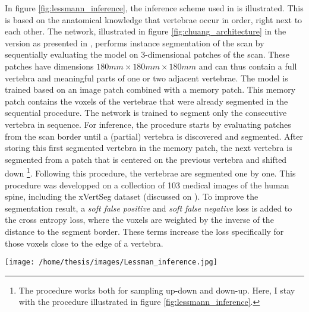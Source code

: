 \par{
    In figure \ref{fig:lessmann_inference}, the inference scheme used in \cite{Lessmann2018} is illustrated.
    This is based on the anatomical knowledge that vertebrae occur in order, right next to each other.
    The network, illustrated in figure \ref{fig:chuang_architecture} in the version as presented in \cite{Chuang2019}, 
    performs instance segmentation of the scan by sequentially evaluating the model on 3-dimensional patches of the scan. 
    These patches have dimensions $180mm \times 180mm \times 180mm$ and can thus contain a full vertebra and meaningful parts of one or two adjacent vertebrae.
    The model is trained based on an image patch combined with a memory patch. This memory patch contains the voxels of the vertebrae that were already segmented in the sequential procedure.
    The network is trained to segment only the consecutive vertebra in sequence.
    For inference, the procedure starts by evaluating patches from the scan border until a (partial) vertebra is discovered and segmented.
    After storing this first segmented vertebra in the memory patch, the next vertebra is segmented from a patch that is centered on the previous vertebra and shifted down
    \footnote{The procedure works both for sampling up-down and down-up. Here, I stay with the procedure illustrated in figure \ref{fig:lessmann_inference}.}.
    Following this procedure, the vertebrae are segmented one by one.
    This procedure was developped on a collection of 103 medical images of the human spine, including the xVertSeg dataset (discussed on \pageref{sec:xVertSeg}). 
    To improve the segmentation result, a \textit{soft false positive} and \textit{soft false negative} loss is added to the cross entropy loss, where the voxels are weighted by the inverse of the distance to the segment border. 
    These terms increase the loss specifically for those voxels close to the edge of a vertebra.
}
\begin{SCfigure}[][htb]
    \texttt{[image: /home/thesis/images/Lessman\_inference.jpg]}
    \caption{Illustration of the inference scheme used in \cite{Lessmann2018} (image taken from same). }
    \label{fig:lessmann_inference}
\end{SCfigure}
